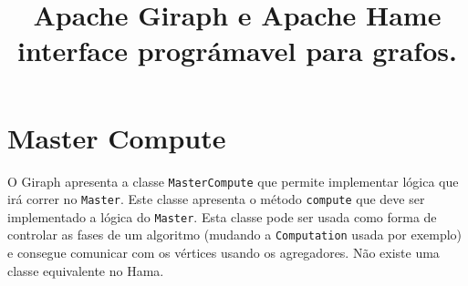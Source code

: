 \documentclass[a4paper,10pt]{report}
\title{Apache Giraph e Apache Hame interface prográmavel para grafos.}
\author{}
\begin{document}
\maketitle

\section*{Master Compute}

O Giraph apresenta a classe \texttt{MasterCompute} que permite implementar lógica que irá correr no \texttt{Master}. Este classe apresenta o método \texttt{compute} que deve ser implementado a lógica do \texttt{Master}. Esta classe pode ser usada como forma de controlar as fases de um algoritmo (mudando a \texttt{Computation} usada por exemplo) e consegue comunicar com os vértices usando os agregadores. Não existe uma classe equivalente no Hama.










\end{document}
